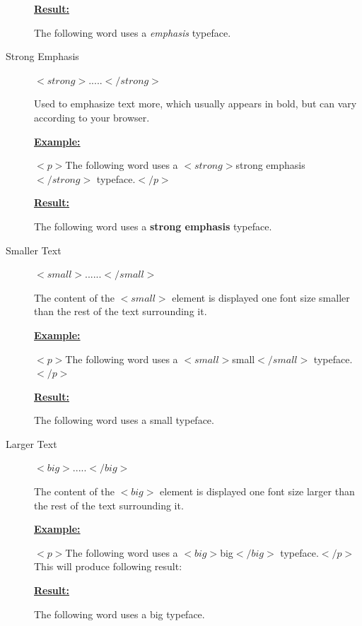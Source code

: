 \documentclass[11pt,a4paper]{article}
\begin{document}
\begin{description}
\underline{\textbf{Result:}}

\hspace{1cm}The following word uses a \emph{emphasis} typeface.\

\item[Strong Emphasis] $<strong>.....</strong>$

\hspace{1cm}Used to emphasize text more, which usually appears in bold, but can vary according to your browser.\

\underline{\textbf{Example:}}

\hspace{1cm}$<p>$The following word uses a $<strong>$strong emphasis$</strong>$ typeface.$</p>$

\underline{\textbf{Result:}}

\hspace{1cm}The following word uses a \textbf{strong emphasis} typeface.\

\item[Smaller Text] $<small>......</small>$

\hspace{1cm}The content of the $<small>$ element is displayed one font size smaller than the rest of the text surrounding it.\

\underline{\textbf{Example:}}

\hspace{1cm}$<p>$The following word uses a $<small>$small$</small>$ typeface.$</p>$

\underline{\textbf{Result:}}

\hspace{1cm}The following word uses a \small{small} typeface.\

\item[Larger Text] $<big>.....</big>$

\hspace{1cm} The content of the $<big>$ element is displayed one font size larger than the rest of the text surrounding it.\

\underline{\textbf{Example:}}

\hspace{1cm}$<p>$The following word uses a $<big>$big$</big>$ typeface.$</p>$
This will produce following result:

\underline{\textbf{Result:}}

\hspace{1cm}The following word uses a {\large{big}} typeface.\



\end{description}
\end{document}
